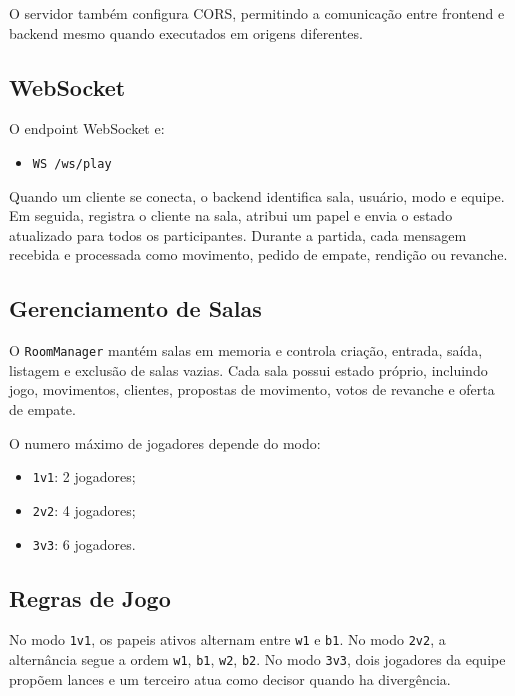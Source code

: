 \documentclass[12pt]{article}
\begin{document}
O servidor também configura CORS, permitindo a comunicação entre frontend e backend mesmo quando executados em origens diferentes.

\subsection{WebSocket}

O endpoint WebSocket e:

\begin{itemize}
    \item \texttt{WS /ws/play}
\end{itemize}

Quando um cliente se conecta, o backend identifica sala, usuário, modo e equipe. Em seguida, registra o cliente na sala, atribui um papel e envia o estado atualizado para todos os participantes. Durante a partida, cada mensagem recebida e processada como movimento, pedido de empate, rendição ou revanche.

\subsection{Gerenciamento de Salas}

O \texttt{RoomManager} mantém salas em memoria e controla criação, entrada, saída, listagem e exclusão de salas vazias. Cada sala possui estado próprio, incluindo jogo, movimentos, clientes, propostas de movimento, votos de revanche e oferta de empate.

O numero máximo de jogadores depende do modo:

\begin{itemize}
    \item \texttt{1v1}: 2 jogadores;
    \item \texttt{2v2}: 4 jogadores;
    \item \texttt{3v3}: 6 jogadores.
\end{itemize}

\subsection{Regras de Jogo}

No modo \texttt{1v1}, os papeis ativos alternam entre \texttt{w1} e \texttt{b1}. No modo \texttt{2v2}, a alternância segue a ordem \texttt{w1}, \texttt{b1}, \texttt{w2}, \texttt{b2}. No modo \texttt{3v3}, dois jogadores da equipe propõem lances e um terceiro atua como decisor quando ha divergência.
\end{document}
